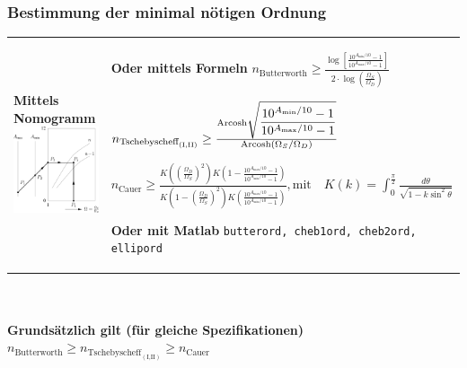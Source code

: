 \subsubsection{Bestimmung der minimal nötigen Ordnung }
\begin{tabular}{p{7cm} p{11cm}}
\parbox{6cm}{
	\textbf{Mittels Nomogramm} \\
	\includegraphics[width=6cm]{./bilder/filter-nomogramme.png}
	}
& \parbox{12cm}{
	\textbf{Oder mittels Formeln}\\
	$n_{\text{Butterworth}} \geq\frac{\log{\left[\displaystyle\frac{10^{A_{\min}/10}-1}
	{10^{A_{\max}/10}-1}\right]}} {2 \cdot \log{\left(\frac{\Omega_{S}}{\Omega_{D}}\right)}}$ \\ \\

	$n_{\text{Tschebyscheff}_{(\text{I,II})}} \geq\frac{{\rm Arcosh}\sqrt{\displaystyle\frac{10^{A_{\min}/10}-1}
	{10^{A_{\max}/10}-1}}}{{\rm Arcosh}\left({\Omega_{S}/\Omega_{D}}\right)}$ \\ \\

	$n_{\text{Cauer}} \geq\frac{K\left(\left( \frac{\Omega_D}{\Omega_S}\right)^2\right)
	K\left(1-\frac{10^{A_{\max}/10}-1}{10^{A_{\min}/10}-1}\right) } {K\left(1-\left(\frac{\Omega_D}
	{\Omega_S}\right)^2\right )K\left(\frac{10^{A_{\max}/10}-1}{10^{A_{\min}/10}-1} \right)},
	\text{mit}\quad
	K(k)=\int_0^{\frac{\pi}{2}}\frac{d\theta}{\sqrt{1-k\sin^2\theta}}$ \\ \\
	
	\textbf{Oder mit Matlab}\\
	\texttt{butterord, cheb1ord, cheb2ord, ellipord}	
	}
\end{tabular} \\ \\
\textbf{Grundsätzlich gilt (für gleiche Spezifikationen)} \quad
$n_{\text{Butterworth}}\geq n_{\text{Tschebyscheff}_{(\text{I,II})}}\geq n_{\text{Cauer}}$
